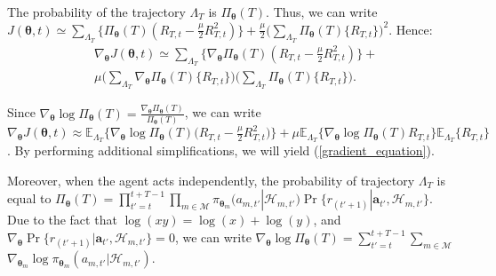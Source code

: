 \documentclass[conference]{IEEEtran}
\begin{document}
The probability of the trajectory $\Lambda_{T}$ is $\Pi_{\boldsymbol{\theta}}(T)$. Thus, we can write $
J(\boldsymbol{\theta},t)\simeq
 \sum_{\Lambda_{T}}\{\Pi_{\boldsymbol{\theta}}(T)(R_{T,t}-\frac{\mu}{2}R_{T,t}^2)\}+
\frac{\mu}{2} \big(\sum_{\Lambda_{T}}\Pi_{\boldsymbol{\theta}}(T)\{R_{T,t}\}\big)^2$. Hence:
\begin{align}
&\nabla_{\boldsymbol{\theta}}J(\boldsymbol{\theta},t)\simeq
\sum_{\Lambda_{T}}\{\nabla_{\boldsymbol{\theta}}\Pi_{\boldsymbol{\theta}}(T)(R_{T,t}-\frac{\mu}{2}R_{T,t}^2)\}+
\nonumber \\ &
\mu \big(\sum_{\Lambda_{T}}\nabla_{\boldsymbol{\theta}}\Pi_{\boldsymbol{\theta}}(T)\{R_{T,t}\}\big) \big(\sum_{\Lambda_{T}}\Pi_{\boldsymbol{\theta}}(T)\{R_{T,t}\}\big).
\label{Delta_J_Linear}
\end{align}

Since $\nabla_{\boldsymbol{\theta}}\log\Pi_{\boldsymbol{\theta}}(T)=\frac{\nabla_{\boldsymbol{\theta}}\Pi_{\boldsymbol{\theta}}(T)}{\Pi_{\boldsymbol{\theta}}(T)}$, we can write $\nabla_{\boldsymbol{\theta}}J(\boldsymbol{\theta},t)\approx \mathbb{E}_{\Lambda_{T}}\{\nabla_{\boldsymbol{\theta}}\log\Pi_{\boldsymbol{\theta}}(T) \big(R_{T,t}-\frac{\mu}{2}R_{T,t}^2\big)\}+\mu \mathbb{E}_{\Lambda_{T}}\{\nabla_{\boldsymbol{\theta}}\log\Pi_{\boldsymbol{\theta}}(T) R_{T,t}\}\mathbb{E}_{\Lambda_{T}}\{R_{T,t}\}$. By performing additional simplifications, we will yield (\ref{gradient_equation}).

Moreover, when the agent acts independently, the probability of trajectory $\Lambda_{T}$ is equal to $\Pi_{\boldsymbol{\theta}}(T)=\prod_{t'=t}^{t+T-1} \prod_{m \in \mathcal{M}} \pi_{\boldsymbol{\theta}_m}(a_{m,t'}|\mathcal{H}_{m,t'})\Pr\{r_{(t'+1)}|\boldsymbol{a}_{t'},\mathcal{H}_{m,t'}\}$. Due to the fact that $\log(xy)=\log(x)+\log(y)$, and $\nabla_{\boldsymbol{\theta}}\Pr\{r_{(t'+1)}|\boldsymbol{a}_{t'},\mathcal{H}_{m,t'}\}=0$, we can write $\nabla_{\boldsymbol{\theta}}\log\Pi_{\boldsymbol{\theta}}(T)=\sum_{t'=t}^{t+T-1} \sum_{m \in \mathcal{M}}$ $ \nabla_{\boldsymbol{\theta}_m} \log\pi_{\boldsymbol{\theta}_m}(a_{m,t'}|\mathcal{H}_{m,t'})$.
\end{document}
